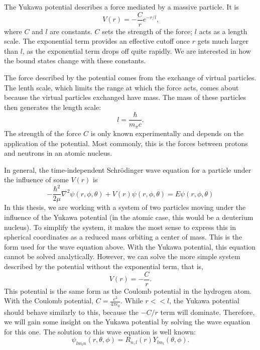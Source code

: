 \documentclass[12pt,twoside]{reedthesis}
\newcommand{\eqn}[1]{\begin{equation}#1\end{equation}}
\begin{document}
The Yukawa potential describes a force mediated by a massive particle. It is %
\eqn{
V(r) = -\frac{C}{r}e^{-r/l}\mbox{,}
}
where $C$ and $l$ are constants. $C$ sets the strength of the force; $l$ acts as a length scale. The exponential term provides an effective cutoff once $r$ gets much larger than $l$, as the exponential term drops off quite rapidly. We are interested in how the bound states change with these constants. 

The force described by the potential comes from the exchange of virtual particles. The lenth scale, which limits the range at which the force acts, comes about because the virtual particles exchanged have mass. The mass of these particles then generates the length scale:
\eqn{
l = \frac{\hbar}{m_{\pi}c}\mbox{.}
}
The strength of the force $C$ is only known experimentally and depends on the application of the potential. Most commonly, this is the forces between protons and neutrons in an atomic nucleus.

In general, the time-independent Schr\"odinger wave equation for a particle under the influence of some $V(r)$ is
\eqn{
-\frac{\hbar^2}{2\mu}\nabla^2\psi(r,\phi,\theta) + V(r)\psi (r,\phi,\theta) = E \psi(r,\phi,\theta)
\label{eq:TIDSWE-general}
}
In this thesis, we are working with a system of two particles moving under the influence of the Yukawa potential (in the atomic case, this would be a deuterium nucleus). To simplify the system, it makes the most sense to express this in spherical coordinates as a reduced mass orbiting a center of mass. This is the form used for the wave equation above. With the Yukawa potential, this equation cannot be solved analytically. However, we can solve the more simple system described by the potential without the exponential term, that is,
\eqn{
 V(r) = -\frac{C}{r}\mbox{.}
 }
This potential is the same form as the Coulomb potential in the hydrogen atom. With the Coulomb potential, $C = \frac{e^2}{4\pi \epsilon_0}$. While $r << l$, the Yukawa potential should behave similarly to this, because the $-C/r$ term will dominate. Therefore, we will gain some insight on the Yukawa potential by solving the wave equation for this one.
The solution to this wave equation is well known:
\eqn{
\psi_{l m_l n} (r, \theta, \phi) = R_{n,l}(r) Y_{lm_l}(\theta,\phi)\mbox{.}
}
\end{document}
